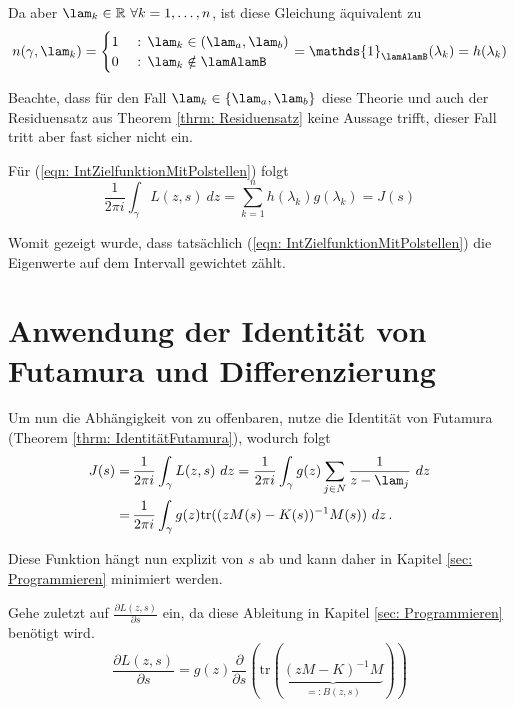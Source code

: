 \documentclass[a4paper,12pt]{report}
\newcommand{\R}{\mathbb R}
\newcommand{\zitat}[1]{\glqq #1\grqq}
\newcommand{\klammer}[1]{\left(#1\right)}
\newcommand{\tr}{\text{tr}}
\newcommand{\inv}{^{-1}}
\newcommand{\1}{\mathds{1}}
\theoremstyle{plain} %
\theoremstyle{definition} %
\theoremstyle{remark}
\begin{document}
            Da aber $\lam_k\in \R\ \forall k=1,\dots,n$, ist diese Gleichung äquivalent zu
            $$n(\gamma, \lam_k) = \begin{cases}
                  1& \text{ : }\lam_k\in (\lam_a,\lam_b)\\
                  0& \text{ : }\lam_k\notin \lamAlamB
            \end{cases} = \1_{\lamAlamB}(\lambda_k) = h(\lambda_k)$$

            Beachte, dass für den Fall $\lam_k \in \{\lam_a, \lam_b\}$ diese Theorie und auch der Residuensatz aus Theorem \ref{thrm: Residuensatz}
            keine Aussage trifft, dieser Fall tritt aber fast sicher nicht ein.

            Für (\ref{eqn: IntZielfunktionMitPolstellen}) folgt
            $$\frac 1 {2\pi i}\int_\gamma L(z,s)\ dz = \sum_{k=1}^{n} h(\lambda_k) g(\lambda_k) = J(s)$$

            Womit gezeigt wurde, dass tatsächlich (\ref{eqn: IntZielfunktionMitPolstellen}) die Eigenwerte auf dem Intervall gewichtet zählt.

      \section{Anwendung der Identität von Futamura und Differenzierung}
            
            Um nun die Abhängigkeit von \s zu offenbaren, nutze die Identität von Futamura (Theorem \ref{thrm: IdentitätFutamura}), wodurch folgt     
            \begin{align}
                  J(s) =&\, \frac 1 {2\pi i}\int_\gamma L(z,s)\ dz = \frac 1 {2\pi i}\int_\gamma g(z)\sum_{j\in N} \frac{1}{z-\lam_j}\ dz\nonumber\\
                  =&\, \frac 1 {2\pi i}\int_\gamma g(z)\tr((zM(s)-K(s))\inv M(s))\ dz\,.\label{eqn: JGleichIntTr}
            \end{align}

            Diese Funktion hängt nun explizit von $s$ ab und kann daher in Kapitel \ref{sec: Programmieren} minimiert werden.
            
            Gehe zuletzt auf $\frac{\partial L(z,s)}{\partial s}$ ein, da diese Ableitung in Kapitel \ref{sec: Programmieren} benötigt wird.
            \begin{equation}
                  \label{eqn: AbleitungZielfunktion}
                  \frac{\partial L(z,s)}{\partial s} = g(z) \frac{\partial}{\partial s}\klammer{\tr(\underbrace{(zM-K)\inv M}_{=:B(z, s)})}
            \end{equation}
\end{document}

